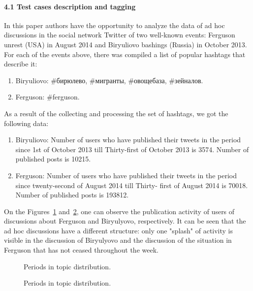 \paragraph{4.1 Test cases description and tagging}
In this paper authors have the opportunity to analyze the data of ad hoc discussions in the social network Twitter of two well-known events: Ferguson unrest (USA) in August 2014 and Biryuliovo bashings (Russia) in October 2013. For each of the events above, there was compiled a list of popular hashtags that describe it:
\begin{enumerate}
	\item Biryuliovo: \#бирюлево, \#мигранты, \#овощебаза, \#зейналов.
	\item Ferguson: \#ferguson.
\end{enumerate}
As a result of the collecting and processing the set of hashtags, we got the following data:
\begin{enumerate}
	\item Biryuliovo: Number of users who have published their tweets in the period since 1st of October 2013 till Thirty-first of October 2013 is 3574. Number of published posts is 10215.
	\item Ferguson: Number of users who have published their tweets in the period since twenty-second of August 2014 till Thirty- first of August 2014 is 70018. Number of published posts is 193812.
\end{enumerate}
On the Figures~\cref{fig:fergusonPublicationActivity} and~\cref{fig:biryulievoPublicationActivity}, one can observe the publication activity of users of discussions about Ferguson and Biryulyovo, respectively. It can be seen that the ad hoc discussions have a different structure: only one "splash" of activity is visible in the discussion of Biryulyovo and the discussion of the situation in Ferguson that has not ceased throughout the week.

\begin{figure}[ht]
	\caption{Periods in topic distribution.}\label{fig:fergusonPublicationActivity}
\end{figure}

\begin{figure}[ht]
	\caption{Periods in topic distribution.}\label{fig:biryulievoPublicationActivity}
\end{figure}


